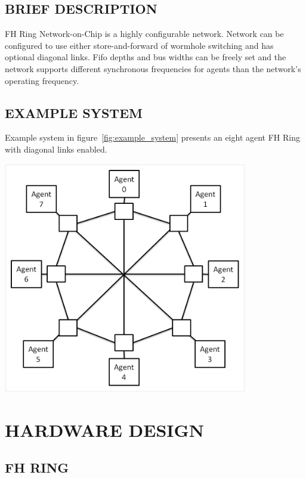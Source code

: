 \documentclass[a4paper,10pt,oneside,final]{article}
\begin{document}
\subsection{BRIEF DESCRIPTION}

FH Ring Network-on-Chip is a highly configurable network. Network can
be configured to use either store-and-forward of wormhole switching
and has optional diagonal links. Fifo depths and bus widths can be
freely set and the network supports different synchronous frequencies
for agents than the network's operating frequency.

\subsection{EXAMPLE SYSTEM}

Example system in figure~\ref{fig:example_system} presents an eight
agent FH Ring with diagonal links enabled.


\begin{center}  
  \includegraphics[width=0.8\textwidth]{pic/example_system.png}
  \label{fig:example_system}
\end{center}



\newpage
\section{HARDWARE DESIGN}

\subsection{FH RING}
\end{document}
